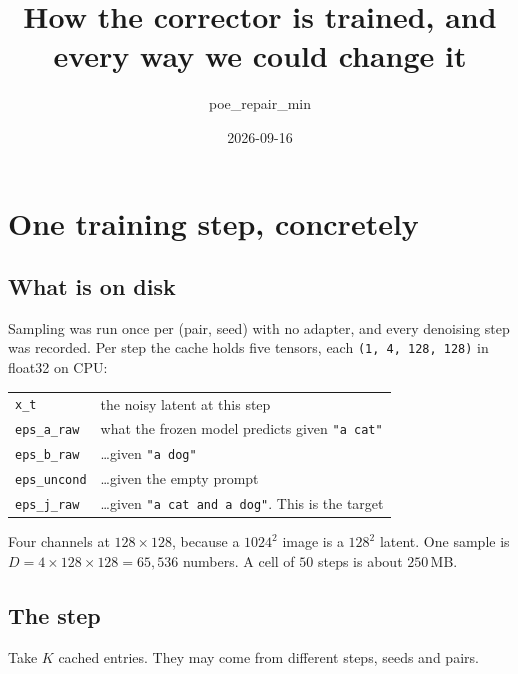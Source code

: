 \documentclass[11pt]{article}
\title{How the corrector is trained, and every way we could change it}
\author{poe\_repair\_min}
\date{2026-09-16}
\newcommand{\shape}[1]{\texttt{(#1)}}
\begin{document}
\maketitle
\vspace{-1.5em}

\noindent{}

\section{One training step, concretely}

\subsection*{What is on disk}
Sampling was run once per (pair, seed) with no adapter, and every denoising step was recorded.
Per step the cache holds five tensors, each \shape{1, 4, 128, 128} in float32 on CPU:

\begin{center}
\small
\begin{tabular}{ll}
\toprule
\texttt{x\_t} & the noisy latent at this step \\
\texttt{eps\_a\_raw} & what the frozen model predicts given \texttt{"a cat"} \\
\texttt{eps\_b\_raw} & \dots given \texttt{"a dog"} \\
\texttt{eps\_uncond} & \dots given the empty prompt \\
\texttt{eps\_j\_raw} & \dots given \texttt{"a cat and a dog"}. This is the target \\
\bottomrule
\end{tabular}
\end{center}

Four channels at $128\times128$, because a $1024^2$ image is a $128^2$ latent. One sample is
$D = 4\times128\times128 = 65{,}536$ numbers. A cell of $50$ steps is about $250$\,MB.

\subsection*{The step}
Take $K$ cached entries. They may come from different steps, seeds and pairs.
\end{document}
